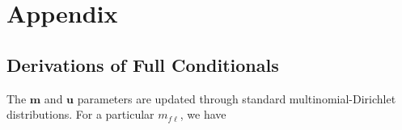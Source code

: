 \documentclass[ba]{imsart}
\begin{document}
	
	\clearpage
	
	\bigskip
	
	
	
	
	\clearpage
	
	\section*{Appendix}
	\label{sec:appendix}
	
	\hypertarget{app:derivations}{%
	\subsection{Derivations of Full Conditionals}\label{app:derivations}}

The $\bm{m}$ and $\bm{u}$ parameters are updated through standard multinomial-Dirichlet distributions. For a particular $m_{f\ell}$, we have
\end{document}

